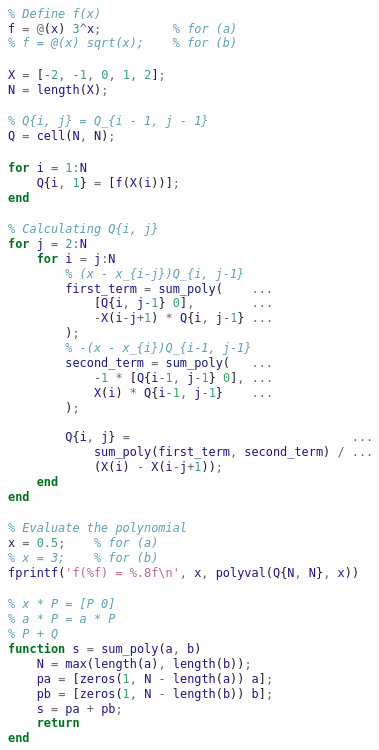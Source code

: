 \documentclass{homework}
\begin{document}

\begin{lstlisting}[language=Matlab,basicstyle=\footnotesize\ttfamily]
% Neville's Method

% Define f(x)
f = @(x) 3^x;          % for (a)
% f = @(x) sqrt(x);    % for (b)

X = [-2, -1, 0, 1, 2];
N = length(X);

% Q{i, j} = Q_{i - 1, j - 1}
Q = cell(N, N);

for i = 1:N
    Q{i, 1} = [f(X(i))];
end

% Calculating Q{i, j}
for j = 2:N
    for i = j:N
        % (x - x_{i-j})Q_{i, j-1}
        first_term = sum_poly(    ...
            [Q{i, j-1} 0],        ...
            -X(i-j+1) * Q{i, j-1} ...
        );
        % -(x - x_{i})Q_{i-1, j-1}
        second_term = sum_poly(   ...
            -1 * [Q{i-1, j-1} 0], ...
            X(i) * Q{i-1, j-1}    ...
        );
        
        Q{i, j} =                               ...
            sum_poly(first_term, second_term) / ...
            (X(i) - X(i-j+1));
    end
end

% Evaluate the polynomial
x = 0.5;    % for (a)
% x = 3;    % for (b)
fprintf('f(%f) = %.8f\n', x, polyval(Q{N, N}, x))

% x * P = [P 0]
% a * P = a * P
% P + Q
function s = sum_poly(a, b)
    N = max(length(a), length(b));
    pa = [zeros(1, N - length(a)) a];
    pb = [zeros(1, N - length(b)) b];
    s = pa + pb;
    return
end
\end{lstlisting}
\end{document}
